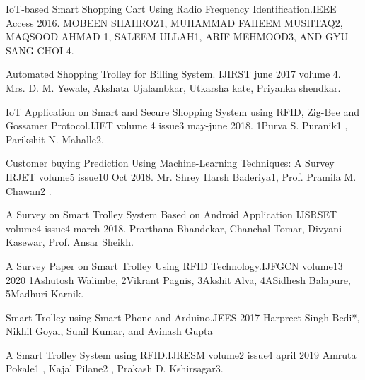 \documentclass[conference]{IEEEtran}
\begin{document}
\begin{thebibliography}{00}
 IoT-based Smart Shopping Cart Using Radio Frequency Identification.IEEE Access 2016. 
MOBEEN SHAHROZ1, MUHAMMAD FAHEEM MUSHTAQ2, MAQSOOD AHMAD 1, SALEEM ULLAH1, ARIF MEHMOOD3, AND GYU SANG CHOI 4.

 Automated Shopping Trolley for Billing System. IJIRST june 2017 volume 4. 
Mrs. D. M. Yewale, Akshata Ujalambkar, Utkarsha kate, Priyanka shendkar.

 IoT Application on Smart and Secure Shopping System using RFID, Zig-Bee and Gossamer Protocol.IJET volume 4 issue3 may-june 2018. 
1Purva S. Puranik1 , Parikshit N. Mahalle2.

 Customer buying Prediction Using Machine-Learning 
Techniques: A Survey IRJET volume5 issue10 Oct 2018.
Mr. Shrey Harsh Baderiya1, Prof. Pramila M. Chawan2 .

 A Survey on Smart Trolley System Based on Android Application IJSRSET volume4 issue4 march 2018.  
Prarthana Bhandekar, Chanchal Tomar, Divyani Kasewar, Prof. Ansar Sheikh.

 A Survey Paper on Smart Trolley Using RFID Technology.IJFGCN volume13 2020 
1Ashutosh Walimbe, 2Vikrant Pagnis, 3Akshit Alva, 4ASidhesh Balapure, 
5Madhuri Karnik.

 Smart Trolley using Smart Phone and Arduino.JEES 2017
Harpreet Singh Bedi*, Nikhil Goyal, Sunil Kumar, and Avinash Gupta

A Smart Trolley System using RFID.IJRESM volume2 issue4 april 2019 
Amruta Pokale1 , Kajal Pilane2 , Prakash D. Kshirsagar3.


\end{thebibliography}
\end{document}
